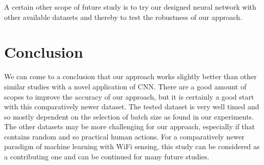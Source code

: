 \documentclass[conference]{IEEEtran}
\begin{document}
A certain other scope of future study is to try our designed neural network with other available datasets and thereby to test the robustness of our approach. 


\section{Conclusion}
We can come to a conclusion that our approach works slightly better than other similar studies with a novel application of CNN. There are a good amount of scopes to improve the accuracy of our approach, but it is certainly a good start with this comparatively newer dataset. The tested dataset is very well timed and so mostly dependent on the selection of batch size as found in our experiments. The other datasets may be more challenging for our approach, especially if that contains random and so practical human actions. For a comparatively newer paradigm of machine learning with WiFi sensing, this study can be considered as a contributing one and can be continued for many future studies.

\end{document}
